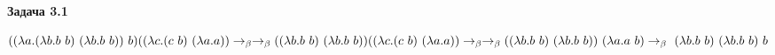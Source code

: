 \documentclass{article}
\begin{document}
 
	\centerline{\bf Задача 3.1}
	
	$ \\[1ex]
	((\lambda a.(\lambda b.b \ b) \ (\lambda b.b \ b)) \ b) ((\lambda c.(c \ b) \ (\lambda a.a)) \rightarrow_{\beta} \\[1ex] 
	\rightarrow_{\beta}
	 ((\lambda b.b \ b) \ (\lambda b.b \ b)) ((\lambda c.(c \ b) \ (\lambda a.a)) \rightarrow_{\beta} \\[1ex] 
	 \rightarrow_{\beta} ((\lambda b.b \ b) \ (\lambda b.b \ b)) \ (\lambda a.a \ b) \rightarrow_{\beta} \ (\lambda b.b \ b) \ (\lambda b.b \ b) \ b$
\end{document}
